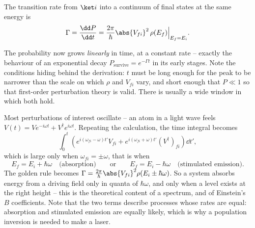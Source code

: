 \begin{theorem}
    The transition rate from $\ket i$ into a continuum of final states at the same energy is
    $$
    \Gamma = \frac{\dd P}{\dd t} = \frac{2\pi}{\hbar}\abs{V_{fi}}^2\,\rho(E_f)\Big|_{E_f = E_i}.
    $$
\end{theorem}

The probability now grows \emph{linearly} in time, at a constant rate -- exactly the behaviour of an exponential decay $P_{\text{survive}} = e^{-\Gamma t}$ in its early stages. Note the conditions hiding behind the derivation: $t$ must be long enough for the peak to be narrower than the scale on which $\rho$ and $V_{fi}$ vary, and short enough that $P \ll 1$ so that first-order perturbation theory is valid. There is usually a wide window in which both hold.

\begin{center}
\end{center}

\begin{example}
    Most perturbations of interest oscillate -- an atom in a light wave feels $V(t) = V e^{-i\omega t} + V^\dagger e^{i\omega t}$. Repeating the calculation, the time integral becomes
    $$
    \int_0^t \left( e^{i(\omega_{fi}-\omega)t'}V_{fi} + e^{i(\omega_{fi}+\omega)t'}(V^\dagger)_{fi} \right)\dd t',
    $$
    which is large only when $\omega_{fi} = \pm\omega$, that is when
    $$
    E_f = E_i + \hbar\omega \quad \text{(absorption)} \qquad \text{or} \qquad E_f = E_i - \hbar\omega \quad \text{(stimulated emission)}.
    $$
    The golden rule becomes $\Gamma = \frac{2\pi}{\hbar}\abs{V_{fi}}^2\rho(E_i\pm\hbar\omega)$. So a system absorbs energy from a driving field only in quanta of $\hbar\omega$, and only when a level exists at the right height -- this is the theoretical content of a spectrum, and of Einstein's $B$ coefficients. Note that the two terms describe processes whose rates are equal: absorption and stimulated emission are equally likely, which is why a population inversion is needed to make a laser.
\end{example}

